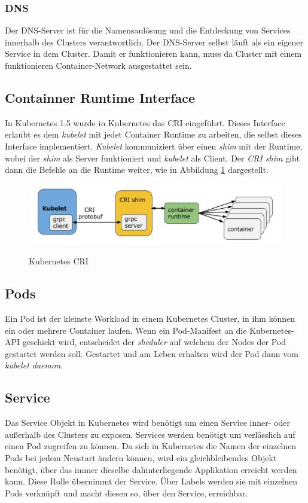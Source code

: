 \subsubsection{DNS}
Der \ac{DNS}-Server ist für die Namensaulösung und die Entdeckung von Services innerhalb des Clusters verantwortlich. 
Der \ac{DNS}-Server selbst läuft als ein eigener Service in dem Cluster.
Damit er funktionieren kann, muss da Cluster mit einem funktionieren Container-Network ausgestattet sein. 
\cite[S.34 f]{Kubernetes_up_and_running}

\subsection{Containner Runtime Interface}
In Kubernetes 1.5 wurde in Kubernetes das \ac{CRI} eingeführt.
Dieses Interface erlaubt es dem \textit{kubelet} mit jedet Container Runtime zu arbeiten, die selbst dieses Interface implementiert. 
\textit{Kubelet} kommuniziert über einen \textit{shim} mit der Runtime, wobei der \textit{shim} als Server funktioniert und \textit{kubelet} als Client.
Der \textit{\ac{CRI} shim} gibt dann die Befehle an die Runtime weiter, wie in Abbildung \ref{fig:cri} dargestellt.
\begin{figure}[ht]
        \caption{Kubernetes \ac{CRI}\cite{kubernetes_cri}}
        \centering
        \includegraphics[width=\textwidth]{bilder/kubernetes_cri.png}
        \label{fig:cri}
\end{figure}
\cite{kubernetes_cri}

\subsection{Pods}
Ein Pod ist der kleinste Workload in einem Kubernetes Cluster, in ihm können ein oder mehrere Container laufen.
Wenn ein Pod-Manifest an die Kubernetes-\ac{API} geschickt wird, entscheidet der \textit{sheduler} auf welchem der Nodes der Pod gestartet werden soll.
Gestartet und am Leben erhalten wird der Pod dann vom \textit{kubelet daemon}.
\cite[S.63]{Kubernetes_up_and_running}

\subsection{Service}
Das Service Objekt in Kubernetes wird benötigt um einen Service inner- oder außerhalb des Clusters zu exposen.
Services werden benötigt um verlässlich auf einen Pod zugreifen zu können.
Da sich in Kubernetes die Namen der einzelnen Pods bei jedem Neustart ändern können, wird ein gleichbleibendes Objekt benötigt, über das immer dieselbe dahinterliegende Applikation erreicht werden kann.
Diese Rolle übernimmt der Service.
Über Labels werden sie mit einzelnen Pods verknüpft und macht diesen so, über den Service, erreichbar.
\cite[S.86]{Kubernetes_up_and_running}

